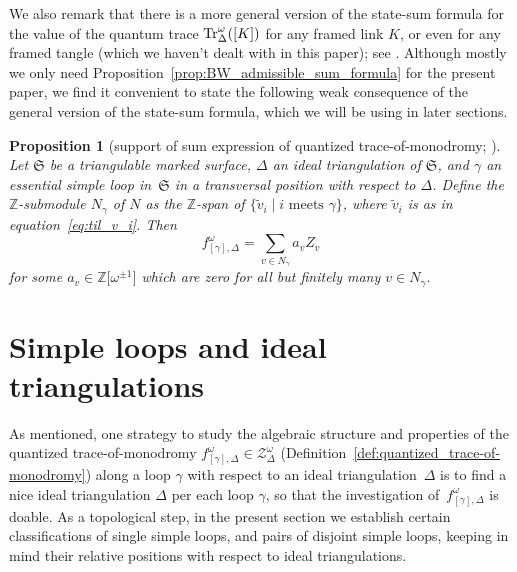 \documentclass[pdftex]{sigma}
\numberwithin{equation}{section}
\newtheorem{Proposition}[Theorem]{Proposition}
\theoremstyle{definition}
\newcommand{\til}[1]{\widetilde{#1}}
\begin{document}
We also remark that there is a more general version of the state-sum formula for the value of the quantum trace ${\rm Tr}^\omega_\Delta([K])$ for any framed link $K$, or even for any framed tangle (which we haven't dealt with in this paper); see \cite{BW}. Although mostly we only need Proposition~\ref{prop:BW_admissible_sum_formula} for the present paper, we find it convenient to state the following weak consequence of the general version of the state-sum formula, which we will be using in later sections.
\begin{Proposition}[support of sum expression of quantized trace-of-monodromy; \cite{BW}]
\label{prop:weak_sum}
Let $\mathfrak{S}$ be a triangulable marked surface, $\Delta$ an ideal triangulation of $\mathfrak{S}$, and $\gamma$ an essential simple loop in~$\mathfrak{S}$ in a transversal position with respect to $\Delta$. Define the $\mathbb{Z}$-submodule $N_\gamma$ of $N$ as the $\mathbb{Z}$-span of $\{\til{v}_i \mid \mbox{$i$ meets $\gamma$}\}$, where $\til{v}_i$ is as in equation~\eqref{eq:til_v_i}. Then
\[
f^\omega_{[\gamma],\Delta} = \sum_{v\in N_\gamma} a_v Z_v
\]
for some $a_v \in \mathbb{Z}\bigl[\omega^{\pm 1}\bigr]$ which are zero for all but finitely many $v\in N_\gamma$.
\end{Proposition}
\section{Simple loops and ideal triangulations}
As mentioned, one strategy to study the algebraic structure and properties of the quantized trace-of-monodromy $f^\omega_{[\gamma],\Delta} \in \mathcal{Z}^\omega_\Delta$ (Definition~\ref{def:quantized_trace-of-monodromy}) along a loop $\gamma$ with respect to an ideal triangulation~$\Delta$ is to find a nice ideal triangulation $\Delta$ per each loop $\gamma$, so that the investigation of~$f^\omega_{[\gamma],\Delta}$ is doable. As a topological step, in the present section we establish certain classifications of single simple loops, and pairs of disjoint simple loops, keeping in mind their relative positions with respect to ideal triangulations.
\end{document}

